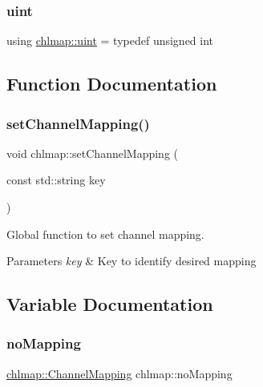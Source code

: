 \mbox{\label{namespacechlmap_a51093e4e5b1ccf24696e04d671728200}} 
\subsubsection{\texorpdfstring{uint}{uint}}
{\footnotesize\ttfamily using \hyperlink{namespacechlmap_a51093e4e5b1ccf24696e04d671728200}{chlmap\+::uint} = typedef unsigned int}



\subsection{Function Documentation}
\mbox{\label{namespacechlmap_a945bd413e64427712373da77277dd443}} 
\subsubsection{\texorpdfstring{set\+Channel\+Mapping()}{setChannelMapping()}}
{\footnotesize\ttfamily void chlmap\+::set\+Channel\+Mapping (\begin{DoxyParamCaption}\item[{const std\+::string}]{key }\end{DoxyParamCaption})}



Global function to set channel mapping. 


\begin{DoxyParams}{Parameters}
{\em key} & Key to identify desired mapping \\
\hline
\end{DoxyParams}


\subsection{Variable Documentation}
\mbox{\label{namespacechlmap_adeefba45d9765c580e5f7ef9cb99acc5}} 
\subsubsection{\texorpdfstring{no\+Mapping}{noMapping}}
{\footnotesize\ttfamily \hyperlink{namespacechlmap_a5bb86fec567a6f1a0646881a9284bb01}{chlmap\+::\+Channel\+Mapping} chlmap\+::no\+Mapping}

